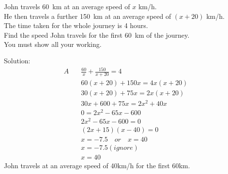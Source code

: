 \begin{mtask}[resume]
   \task \begin{exercise} John travels \qty{60}{\kilo\metre} at an average speed of $x$ km/h.\\
                          He then travels a further \qty{150}{\kilo\metre} at an average speed of $(x+20)$ km/h. \\
						  The time taken for the whole journey is 4 hours.\\
						  Find the speed John travels for the first \qty{60}{\kilo\metre} of the journey.\\
						  You must show all your working.
              \begin{envSolution}
			      Solution:
			      \begin{align*}
			        A \quad & \frac{60}{x}+\frac{150}{x+20}=4  \\[10pt]
					      & 60(x+20)+150x=4x(x+20)           \\  
                          & 30(x+20)+75x=2x(x+20) 	  	    \\
					      & 30x+600+75x=2x^2+40x             \\
                     & 0=2x^2-65x-600                   \\
 					 & 2x^2-65x-600=0                   \\
					 & (2x+15)(x-40)=0                  \\
					 & x=-7.5 \quad or \quad x=40       \\
					 & x=-7.5 (ignore)                  \\
					 & x=40                             
				 \end{align*}
				 \-\hspace{1cm}John travels at an average speed of 40km/h for the first 60km.\\
                 \begin{shortsolution}  
                 \end{shortsolution}
             \end{envSolution}
        \end{exercise}

\end{mtask}



\clearpage\noindent%
